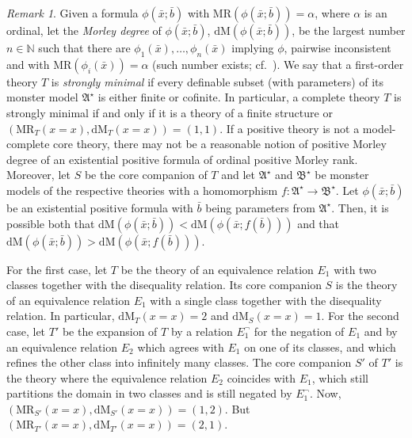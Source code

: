 \documentclass{amsart}
\theoremstyle{definition}
\theoremstyle{remark}
\newtheorem{remark}[theorem]{Remark}
\numberwithin{equation}{section}
\newcommand\green[1]{\textcolor{green!50!black}{#1}}
\newcommand{\RM}{\mathrm{MR}}
\newcommand{\dM}{\mathrm{dM}}
\newcommand{\fa}{\mathfrak{A}}
\newcommand{\fb}{\mathfrak{B}}
\begin{document}
\begin{remark}\label{rem:stronglymin} Given a formula $\phi(\bar{x};\bar{b})$ with $\RM(\phi(\bar{x};\bar{b}))=\alpha$, where $\alpha$ is an ordinal, let the \emph{Morley degree} of $\phi(\bar{x};\bar{b})$, $\dM(\phi(\bar{x};\bar{b}))$, be the largest number $n\in\mathbb{N}$ such that there are $\phi_1(\bar{x}), \dots, \phi_n(\bar{x})$ implying $\phi$, pairwise inconsistent and with $\RM(\phi_i(\bar{x}))=\alpha$ (such number exists; cf.~\cite[Lemma 2.6.4]{Tent-Ziegler}). We say that a first-order theory $T$ is \emph{strongly minimal} if every definable subset (with parameters) of its monster model $\fa^\star$ is either finite or cofinite. In particular, a complete theory $T$ is strongly minimal if and only if it is a theory of a finite structure or $(\RM_T(x=x), \dM_T({x=x}))=(1,1)$. 
If a positive theory is not a model-complete core theory, there may not be a reasonable notion of positive Morley degree of an existential positive formula of ordinal positive Morley rank. Moreover, let $S$ be the core companion  of $T$ and let $\fa^\star$ and $\fb^\star$ be monster models of the respective theories with a homomorphism $f \colon \fa^\star\to\fb^\star$. Let $\phi(\bar{x};\bar{b})$  be an existential positive formula with $\bar{b}$ being parameters from $\fa^\star$. Then, it is possible both that $\dM(\phi(\bar{x};\bar{b}))<\dM(\phi(\bar{x};f(\bar{b})))$ and that $\dM(\phi(\bar{x};\bar{b}))>\dM(\phi(\bar{x};f(\bar{b})))$. 

For the first case, let $T$ be the theory of an equivalence relation $E_1$ with two classes {together with the disequality relation}. Its core companion  $S$ is the theory of an equivalence relation $E_1$ with a single class {together with the disequality relation}. In particular, $\dM_T(x=x)=2$ and $\dM_S(x=x)=1$. For the second case, let $T'$ be the expansion of $T$ by a relation $E_1^\neg$ for the negation of $E_1$ and by an equivalence relation $E_2$ which agrees with $E_1$ on one of its classes, and which refines the other class into infinitely many classes. The core companion  $S'$ of $T'$ is the theory where the equivalence relation $E_2$ coincides with $E_1$, which still partitions the domain in two classes and is still negated by $E_1^\neg$. Now, $(\RM_{S'}(x=x),\dM_{S'}(x=x))=(1,2)$. But $(\RM_{T'}(x=x),\dM_{T'}(x=x))=(2,1)$.
\end{remark}
\end{document}
